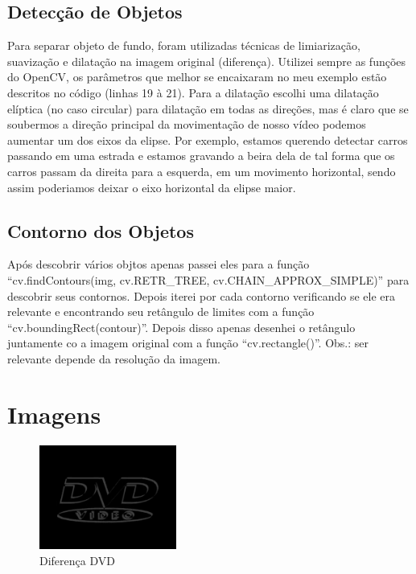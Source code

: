 \documentclass[12pt, letterpaper]{article}
\begin{document}
	\subsection{Detecção de Objetos}
		Para separar objeto de fundo, foram utilizadas técnicas de limiarização, suavização e dilatação na imagem original (diferença). Utilizei sempre as funções do OpenCV, os parâmetros que melhor se encaixaram no meu exemplo estão descritos no código (linhas 19 à 21). Para a dilatação escolhi uma dilatação elíptica (no caso circular) para dilatação em todas as direções, mas é claro que se soubermos a direção principal da movimentação de nosso vídeo podemos aumentar um dos eixos da elipse. Por exemplo, estamos querendo detectar carros passando em uma estrada e estamos gravando a beira dela de tal forma que os carros passam da direita para a esquerda, em um movimento horizontal, sendo assim poderiamos deixar o eixo horizontal da elipse maior.
	\subsection{Contorno dos Objetos}
		Após descobrir vários objtos apenas passei eles para a função ``cv.findContours(img, cv.RETR\_TREE, cv.CHAIN\_APPROX\_SIMPLE)'' para descobrir seus contornos. Depois iterei por cada contorno verificando se ele era relevante e encontrando seu retângulo de limites com a função ``cv.boundingRect(contour)''. Depois disso apenas desenhei o retângulo juntamente co a imagem original com a função ``cv.rectangle()''. Obs.: ser relevante depende da resolução da imagem.

\newpage
\section{Imagens}
	\begin{figure}[h]
        \centering
        \includegraphics[width=0.4\textwidth]{diff.png}
        \\{Diferença DVD}
    \end{figure}
\end{document}
